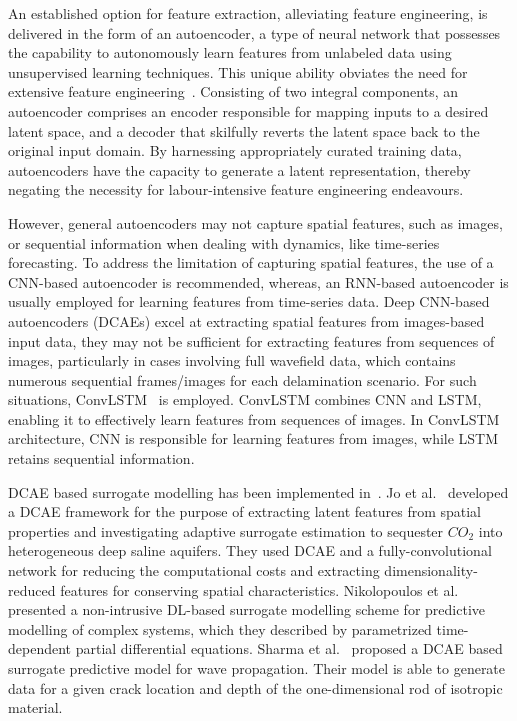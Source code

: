 An established option for feature extraction, alleviating feature engineering, 
is delivered in the form of an autoencoder, a type of neural network that 
possesses the capability to autonomously learn features from unlabeled data 
using unsupervised learning techniques. 
This unique ability obviates the need for extensive feature 
engineering~\cite{pinaya2020autoencoders, ardelean2023study, 
simpson2021machine}. 
Consisting of two integral components, an autoencoder comprises an encoder responsible for mapping inputs to a desired latent space, and a decoder that skilfully reverts the latent space back to the original input domain. 
By harnessing appropriately curated training data, autoencoders have the capacity to generate a latent representation, thereby negating the necessity for labour-intensive feature engineering endeavours.

However, general autoencoders may not capture spatial features, such as images, or sequential information when dealing with dynamics, like time-series forecasting. 
To address the limitation of capturing spatial features, the use of a CNN-based autoencoder is recommended, whereas, an RNN-based autoencoder is usually employed for learning features from time-series data.
Deep CNN-based autoencoders (DCAEs) excel at extracting spatial features from images-based input data, they may not be sufficient for extracting features from sequences of images, particularly in cases involving full wavefield data, which contains numerous sequential frames/images for each delamination scenario. 
For such situations, ConvLSTM~\cite{shi2015convolutional} is employed. 
ConvLSTM combines CNN and LSTM, enabling it to effectively learn features from sequences of images. 
In ConvLSTM architecture, CNN is responsible for learning features from images, while LSTM retains sequential information.

DCAE based surrogate modelling has been implemented in~\cite{jo2021adaptive, nikolopoulos2022non, sharma2022wave}. 
Jo et al.~\cite{jo2021adaptive} developed a DCAE framework for the purpose of extracting latent features from spatial properties and investigating adaptive surrogate estimation to sequester $CO_2$ into heterogeneous deep saline aquifers. 
They used DCAE and a fully-convolutional network for reducing the computational costs and extracting dimensionality-reduced features for conserving spatial characteristics. 
Nikolopoulos et al.~\cite{nikolopoulos2022non} presented a non-intrusive DL-based surrogate modelling scheme for predictive modelling of complex systems, which they described by parametrized time-dependent partial differential equations. 
Sharma et al.~\cite{sharma2022wave} proposed a DCAE based surrogate predictive model for wave propagation. 
Their model is able to generate data for a given crack location and depth of the one-dimensional rod of isotropic material.

